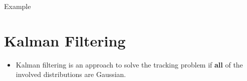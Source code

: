 \documentclass{beamer}
\begin{document}
\begin{frame}{Example}
 
\end{frame}

\section{Kalman Filtering}%

\begin{frame}
 \begin{itemize}
  \item Kalman filtering is an approach to solve the tracking problem if
        \textbf{all} of the involved distributions are Gaussian.
 \end{itemize}

\end{frame}
\end{document}
